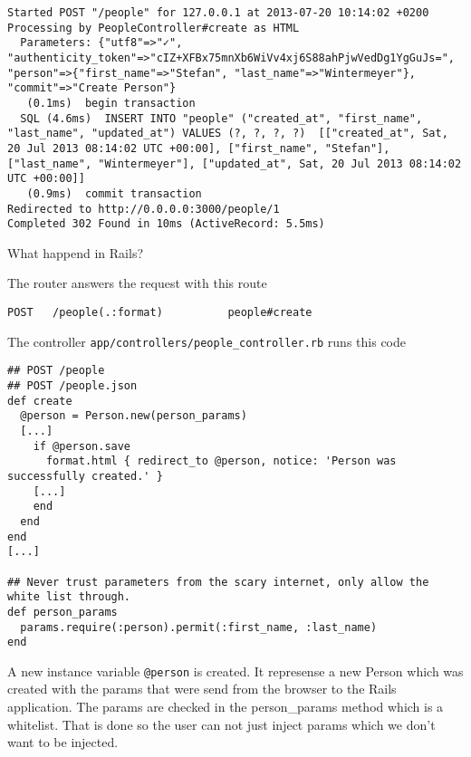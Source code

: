 \documentclass[a4paper]{book}
\begin{document}
\begin{shaded}\begin{verbatim}
Started POST "/people" for 127.0.0.1 at 2013-07-20 10:14:02 +0200
Processing by PeopleController#create as HTML
  Parameters: {"utf8"=>"✓", "authenticity_token"=>"cIZ+XFBx75mnXb6WiVv4xj6S88ahPjwVedDg1YgGuJs=", "person"=>{"first_name"=>"Stefan", "last_name"=>"Wintermeyer"}, "commit"=>"Create Person"}
   (0.1ms)  begin transaction
  SQL (4.6ms)  INSERT INTO "people" ("created_at", "first_name", "last_name", "updated_at") VALUES (?, ?, ?, ?)  [["created_at", Sat, 20 Jul 2013 08:14:02 UTC +00:00], ["first_name", "Stefan"], ["last_name", "Wintermeyer"], ["updated_at", Sat, 20 Jul 2013 08:14:02 UTC +00:00]]
   (0.9ms)  commit transaction
Redirected to http://0.0.0.0:3000/people/1
Completed 302 Found in 10ms (ActiveRecord: 5.5ms)
\end{verbatim}\end{shaded}

What happend in Rails?

The router answers the request with this route

\begin{shaded}\begin{verbatim}
POST   /people(.:format)          people#create
\end{verbatim}\end{shaded}

The controller \texttt{app/controllers/people\_controller.rb} runs this code

\begin{shaded}\begin{verbatim}
## POST /people
## POST /people.json
def create
  @person = Person.new(person_params)
  [...]
    if @person.save
      format.html { redirect_to @person, notice: 'Person was successfully created.' }
    [...]
    end
  end
end
[...]

## Never trust parameters from the scary internet, only allow the white list through.
def person_params
  params.require(:person).permit(:first_name, :last_name)
end
\end{verbatim}\end{shaded}

A new instance variable \texttt{@person} is created. It represense a new Person which was created with the params that were send from the browser to the Rails application. The params are checked in the person\_params method which is a whitelist. That is done so the user can not just inject params which we don't want to be injected.
\end{document}
